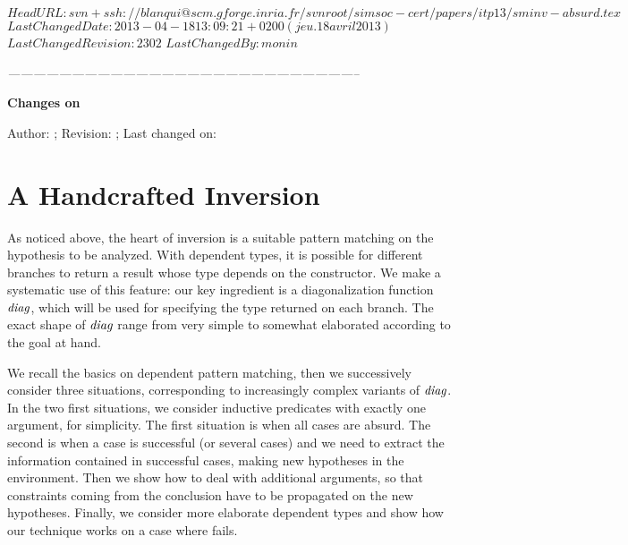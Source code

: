 \svnidlong
{$HeadURL: svn+ssh://blanqui@scm.gforge.inria.fr/svnroot/simsoc-cert/papers/itp13/sminv-absurd.tex $}
{$LastChangedDate: 2013-04-18 13:09:21 +0200 (jeu. 18 avril 2013) $}
{$LastChangedRevision: 2302 $}
{$LastChangedBy: monin $}


\begin{thoughts}
\itshape
\hfil -----------------------------------------------------------------------------------\par
\hfil \textbf{Changes on \currfilename}

Author: \svnfileauthor; Revision: \svnfilerev; Last changed on: \svnfiledate
\end{thoughts}


\section{A Handcrafted Inversion}
\label{sec:hci}

As noticed above, the heart of inversion is a suitable
pattern matching on the hypothesis to be analyzed.
With dependent types, it is possible for different branches
to return a result whose type depends on the constructor.
We make a systematic use of this feature:
our key ingredient is a diagonalization function $\textit{diag}$,
which will be used for specifying the type returned on each branch.
The exact shape of $\textit{diag}$ range from very simple to somewhat elaborated
according to the goal at hand. 

We recall the basics on dependent pattern matching,
then we successively consider three situations,
corresponding to increasingly complex variants of $\textit{diag}$.
In the two first situations, 
we consider inductive predicates with exactly one argument, for simplicity.
The first situation is when all cases are absurd.
The second is when a case is successful (or several cases)
and we need to extract the information contained in successful cases,
making new hypotheses in the environment.
Then we show how to deal with additional arguments,
so that constraints coming from the conclusion have to be propagated
on the new hypotheses.
Finally, we consider more elaborate dependent types
and show how our technique works on a case where \inversion fails.

